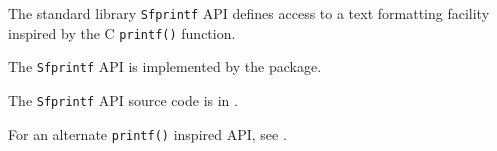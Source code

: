 
The standard library {\tt Sfprintf} API defines access to a text formatting facility inspired 
by the C {\tt printf()} function.

The {\tt Sfprintf} API is implemented by the  package.

The {\tt Sfprintf} API source code is in .

For an alternate {\tt printf()} inspired API, see .

